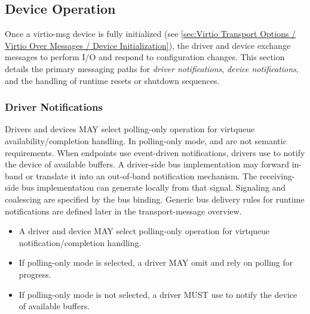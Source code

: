 \subsection{Device Operation}
\label{sec:Virtio Transport Options / Virtio Over Messages / Device Operation}

Once a virtio-msg device is fully initialized (see
\ref{sec:Virtio Transport Options / Virtio Over Messages / Device Initialization}),
the driver and device exchange messages to perform I/O and respond to
configuration changes. This section details the primary messaging paths for
\emph{driver notifications}, \emph{device notifications}, and the handling of
runtime resets or shutdown sequences.

\subsubsection{Driver Notifications}
\label{sec:Virtio Transport Options / Virtio Over Messages / Device Operation / Driver Notifications}

Drivers and devices MAY select polling-only operation for virtqueue
availability/completion handling. In polling-only mode, 
and  are not semantic requirements. When endpoints use
event-driven notifications, drivers use  to notify the
device of available buffers. A driver-side bus implementation may forward
 in-band or translate it into an out-of-band notification
mechanism. The receiving-side bus implementation can generate
 locally from that signal. Signaling and coalescing are
specified by the bus binding. Generic bus delivery
rules for runtime notifications are defined later in the transport-message
overview.

\begin{itemize}
  \item A driver and device MAY select polling-only operation for virtqueue
        notification/completion handling.
  \item If polling-only mode is selected, a driver MAY omit
         and rely on polling for progress.
  \item If polling-only mode is not selected, a driver MUST use
         to notify the device of available buffers.
\end{itemize}

